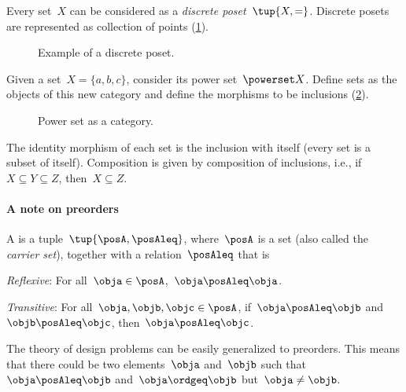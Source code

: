 \begin{example}
  \label{ex:discreteposet}
  Every set~$X$ can be considered as a \emph{discrete poset}~$\tup{X,=}$. Discrete posets are represented as collection of points (\cref{fig:discretepos}).

  \begin{figure}[tbh]
    \centering
    \caption{Example of a discrete poset. \label{fig:discretepos}}
  \end{figure}

  \begin{example}
    \label{ex:hasseinclusion}
    Given a set~$X=\{a,b,c\}$, consider its power set~$\powerset X$. Define sets as the objects of this new category and define the morphisms to be inclusions (\cref{fig:powersetcat}).

    \begin{figure}[h!]
      \begin{center}
      \end{center}
      \caption{Power set as a category.}
      \label{fig:powersetcat}
    \end{figure}

    The identity morphism of each set is the inclusion with itself (every set is a subset of itself). Composition is given by composition of inclusions, i.e., if~$X\subseteq Y \subseteq Z$, then~$X\subseteq Z$.
  \end{example}
\end{example}

\paragraph{A note on preorders}
\begin{definition}[Preorder]
  \label{def:preorder}
  A \emph{} is a tuple~$\tup{\posA, \posAleq}$,
  where~$\posA$ is a set (also called the \emph{carrier set}), together with a
  relation~$\posAleq$  that is
  \begin{compactenum}
    \item \emph{Reflexive}: For all~$\obja\in \posA$,~$\obja\posAleq \obja$.
    \item \emph{Transitive}: For all~$\obja,\objb,\objc\in \posA$, if~$\obja\posAleq \objb$ and~$\objb\posAleq \objc$, then~$\obja\posAleq \objc$.
  \end{compactenum}
\end{definition}
The theory of design problems can be easily generalized to preorders. This means that there could be two elements~$\obja$ and~$\objb$ such that~$\obja\posAleq \objb$ and~$\obja \ordgeq \objb$ but~$\obja \neq \objb$.


